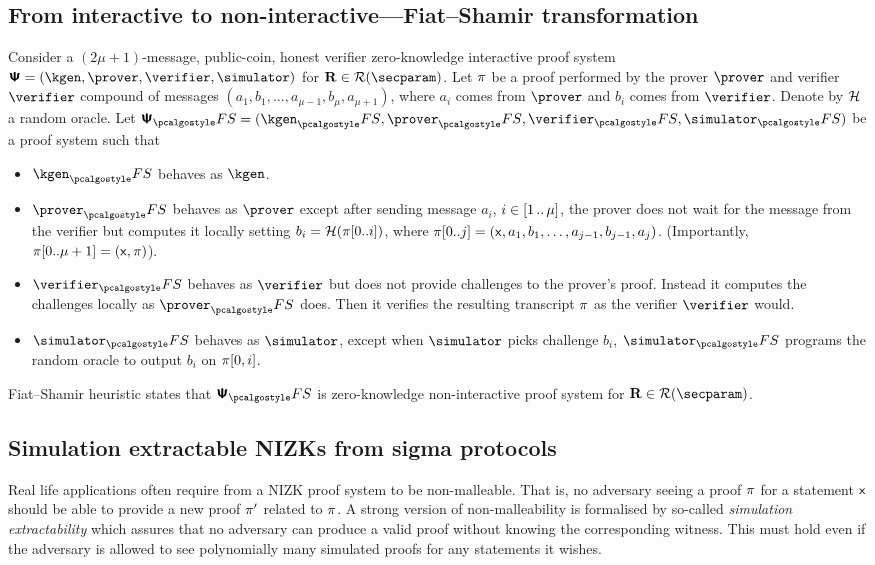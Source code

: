 \documentclass[runningheads,11pt]{llncs}
\theoremstyle{definition} \newtheorem{definition}[theorem]{Definition}
\begin{document}
\subsection{From interactive to non-interactive---Fiat--Shamir transformation}
Consider a $(2\mu + 1)$-message, public-coin, honest verifier zero-knowledge
interactive proof system
$\proofsystem = (\kgen, \prover, \verifier, \simulator)$ for
$\REL \in \RELGEN(\secparam)$.  Let $\pi$ be a proof performed by the
prover $\prover$ and verifier $\verifier$ compound of messages
$(a_1, b_1, \ldots, a_{\mu - 1}, b_{\mu}, a_{\mu + 1})$, where $a_i$ comes from
$\prover$ and $b_i$ comes from $\verifier$.  Denote by $\mathcal{H}$ a random oracle.
Let $\proofsystem_\fs = (\kgen_\fs, \prover_\fs, \verifier_\fs, \simulator_\fs)$
be a proof system such that
\begin{itemize}
  \item $\kgen_\fs$ behaves as $\kgen$.
  \item $\prover_\fs$ behaves as $\prover$ except after sending message
    $a_i$, $i \in [1 \, .. \, \mu]$, the prover does not wait for
    the message from the verifier but computes it locally setting $b_i
    = \mathcal{H}(\pi[0..i])$, where $\pi[0..j] = (\mathsf{x}, a_1, b_1, \ldots,
    a_{j - 1}, b_{j - 1}, a_j)$. (Importantly, $\pi[0..\mu + 1] =
    (\mathsf{x}, \pi)$).
  \item $\verifier_\fs$ behaves as $\verifier$ but does not provide
    challenges to the prover's proof. Instead it computes the
    challenges locally as $\prover_\fs$ does. Then it verifies the
    resulting transcript $\pi$ as the verifier $\verifier$ would. 
  \item $\simulator_\fs$ behaves as $\simulator$, except when
    $\simulator$ picks challenge $b_i$, $\simulator_\fs$ programs the
    random oracle to output $b_i$ on $\pi[0, i]$.
  \end{itemize}

Fiat--Shamir heuristic states that $\proofsystem_\fs$ is zero-knowledge
non-interactive proof system for $\REL \in \RELGEN(\secparam)$.

\subsection{Simulation extractable NIZKs from sigma protocols}
Real life applications often require from a NIZK proof system to be
non-malleable. That is, no adversary seeing a proof $\pi$ for a statement
$\mathsf{x}$ should be able to provide a new proof $\pi'$ related to $\pi$.
A strong version of non-malleability is formalised by so-called \emph{simulation extractability}
which assures that no adversary can produce a valid proof without knowing the
corresponding witness. This must hold even if the adversary is allowed to see
polynomially many simulated proofs for any statements it wishes.
\end{document}
